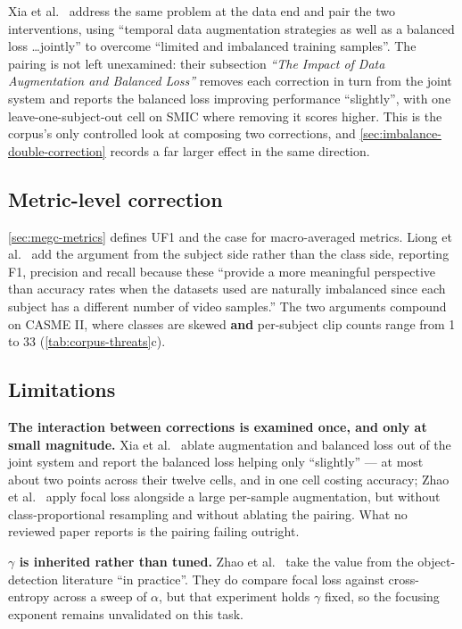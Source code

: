 Xia et al.~\cite{xia2020a} address the same problem at the data end and pair the two interventions, using ``temporal data augmentation strategies as well as a balanced loss \ldots jointly'' to overcome ``limited and imbalanced training samples''. The pairing is not left unexamined: their subsection \textit{``The Impact of Data Augmentation and Balanced Loss''} removes each correction in turn from the joint system and reports the balanced loss improving performance ``slightly'', with one leave-one-subject-out cell on SMIC where removing it scores higher. This is the corpus's only controlled look at composing two corrections, and \autoref{sec:imbalance-double-correction} records a far larger effect in the same direction.

\subsection{Metric-level correction}
\label{sec:imbalance-metrics}

\autoref{sec:megc-metrics} defines UF1 and the case for macro-averaged metrics. Liong et al.~\cite{liong2016} add the argument from the subject side rather than the class side, reporting F1, precision and recall because these ``provide a more meaningful perspective than accuracy rates when the datasets used are naturally imbalanced since each subject has a different number of video samples.'' The two arguments compound on CASME II, where classes are skewed \textbf{and} per-subject clip counts range from 1 to 33 (\autoref{tab:corpus-threats}c).

\subsection{Limitations}
\label{sec:imbalance-limitations}

\textbf{The interaction between corrections is examined once, and only at small magnitude.} Xia et al.~\cite{xia2020a} ablate augmentation and balanced loss out of the joint system and report the balanced loss helping only ``slightly'' --- at most about two points across their twelve cells, and in one cell costing accuracy; Zhao et al.~\cite{zhaoS2021} apply focal loss alongside a large per-sample augmentation, but without class-proportional resampling and without ablating the pairing. What no reviewed paper reports is the pairing failing outright.

\textbf{$\gamma$ is inherited rather than tuned.} Zhao et al.~\cite{zhaoS2021} take the value from the object-detection literature ``in practice''. They do compare focal loss against cross-entropy across a sweep of $\alpha$, but that experiment holds $\gamma$ fixed, so the focusing exponent remains unvalidated on this task.

